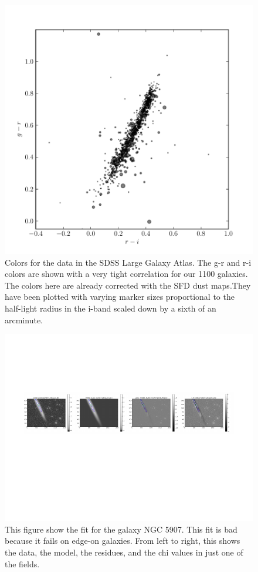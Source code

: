 \documentclass[12pt,preprint,pdftex]{aastex}
\begin{document}
\begin{figure}
\centering
\includegraphics[trim= 0mm 0mm 0mm 10mm]{atlas_colors_size}
\caption{Colors for the data in the SDSS Large Galaxy Atlas. The g-r and r-i colors are shown with a very tight correlation for our 1100 galaxies. The colors here are already corrected with the SFD dust maps.They have been plotted with varying marker sizes proportional to the half-light radius in the i-band scaled down by a sixth of an arcminute.}
\label{fig:atlasconsistency}
\end{figure}

\begin{figure}
\centering
\includegraphics[trim = .9cm 4.5cm 1.15cm 2.9cm,clip=true,width=\textwidth] {edgeon.pdf}
\caption{This figure show the fit for the galaxy NGC 5907. This fit is
 bad because it fails on edge-on galaxies. From left to right, this
 shows the data, the model, the residues, and the chi values in just
 one of the fields.}
\label{fig:edgeon}
\end{figure}
\end{document}
